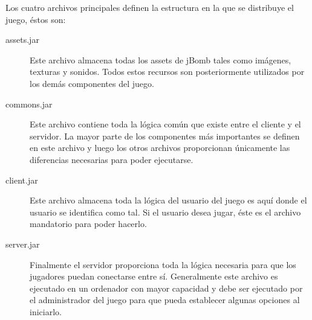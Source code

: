 \documentclass[a4paper,12pt,openany,oneside]{book}
\begin{document}
Los cuatro archivos principales definen la estructura en la que se distribuye el juego, éstos son:
\begin{description}
\item[assets.jar] Este archivo almacena todas los assets de jBomb tales como imágenes, texturas y sonidos. Todos estos recursos son posteriormente utilizados por los demás componentes del juego.
\item[commons.jar] Este archivo contiene toda la lógica común que existe entre el cliente y el servidor. La mayor parte de los componentes más importantes se definen en este archivo y luego los otros archivos proporcionan únicamente las diferencias necesarias para poder ejecutarse.
\item[client.jar] Este archivo almacena toda la lógica del usuario del juego es aquí donde el usuario se identifica como tal. Si el usuario desea jugar, éste es el archivo mandatorio para poder hacerlo.
\item[server.jar] Finalmente el servidor proporciona toda la lógica necesaria para que los jugadores puedan conectarse entre sí. Generalmente este archivo es ejecutado en un ordenador con mayor capacidad y debe ser ejecutado por el administrador del juego para que pueda establecer algunas opciones al iniciarlo.
\end{description}
\end{document}
